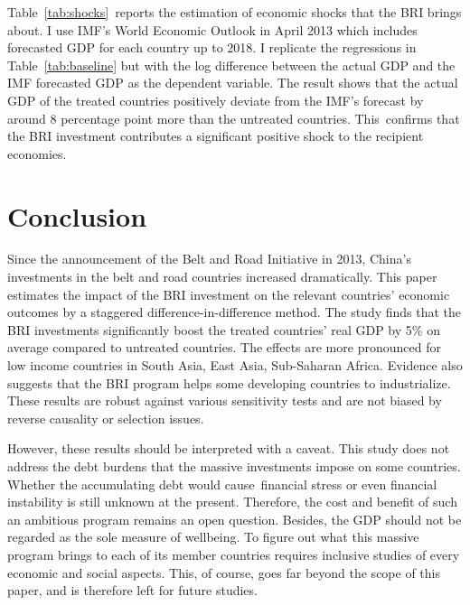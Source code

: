 \documentclass[10pt,a4paper]{article}
\begin{document}
Table~{\ref{tab:shocks}}~reports the estimation of
economic shocks that the BRI brings about. I use IMF's World Economic
Outlook in April 2013 which includes forecasted GDP for each country up
to 2018. I replicate the regressions in
Table~{\ref{tab:baseline}} but with the log difference
between the actual GDP and the IMF forecasted GDP as the dependent
variable. The result shows that the actual GDP of the treated countries
positively deviate from the IMF's forecast by around 8 percentage point
more than the untreated countries. This~{confirms that the BRI
investment contributes a significant positive shock to the recipient
economies.~~}

\par\null

\section{Conclusion}

{\label{322007}}

Since the announcement of the Belt and Road Initiative in 2013, China's
investments in the belt and road countries increased dramatically. This
paper estimates the impact of the BRI investment on the relevant
countries' economic outcomes by a staggered difference-in-difference
method. The study finds that the BRI investments significantly boost the
treated countries' real GDP by 5\% on average compared to untreated
countries. The effects are more pronounced for low income countries in
South Asia, East Asia, Sub-Saharan Africa. Evidence also suggests that
the BRI program helps some developing countries to industrialize. These
results are robust against various sensitivity tests and are not biased
by reverse causality or selection issues.~

However, these results should be interpreted with a caveat. This study
does not address the debt burdens that the massive investments impose on
some countries. Whether the accumulating debt would cause~financial
stress or even financial instability is still unknown at the present.
Therefore, the cost and benefit of such an ambitious program remains an
open question. Besides, the GDP should not be regarded as the sole
measure of wellbeing. To figure out what this massive program brings to
each of its member countries requires inclusive studies of every
economic and social aspects. This, of course, goes far beyond the scope
of this paper, and is therefore left for future studies.~

\par\null
\end{document}

